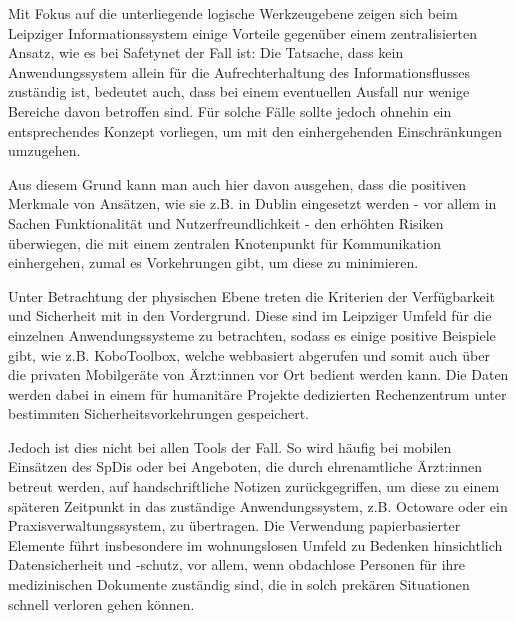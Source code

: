 Mit Fokus auf die unterliegende logische Werkzeugebene zeigen sich beim Leipziger Informationssystem einige Vorteile gegenüber einem zentralisierten Ansatz, wie es bei Safetynet der Fall ist: Die Tatsache, dass kein Anwendungssystem allein für die Aufrechterhaltung des Informationsflusses zuständig ist, bedeutet auch, dass bei einem eventuellen Ausfall nur wenige Bereiche davon betroffen sind. Für solche Fälle sollte jedoch ohnehin ein entsprechendes Konzept vorliegen, um mit den einhergehenden Einschränkungen umzugehen.

Aus diesem Grund kann man auch hier davon ausgehen, dass die positiven Merkmale von Ansätzen, wie sie z.B. in Dublin eingesetzt werden - vor allem in Sachen Funktionalität und Nutzerfreundlichkeit - den erhöhten Risiken überwiegen, die mit einem zentralen Knotenpunkt für Kommunikation einhergehen, zumal es Vorkehrungen gibt, um diese zu minimieren.

Unter Betrachtung der physischen Ebene treten die Kriterien der Verfügbarkeit und Sicherheit mit in den Vordergrund. Diese sind im Leipziger Umfeld für die einzelnen Anwendungssysteme zu betrachten, sodass es einige positive Beispiele gibt, wie z.B. KoboToolbox, welche webbasiert abgerufen und somit auch über die privaten Mobilgeräte von Ärzt:innen vor Ort bedient werden kann. Die Daten werden dabei in einem für humanitäre Projekte dedizierten Rechenzentrum unter bestimmten Sicherheitsvorkehrungen gespeichert.

Jedoch ist dies nicht bei allen Tools der Fall. So wird häufig bei mobilen Einsätzen des \acp{SpDi} oder bei Angeboten, die durch ehrenamtliche Ärzt:innen betreut werden, auf handschriftliche Notizen zurückgegriffen, um diese zu einem späteren Zeitpunkt in das zuständige Anwendungssystem, z.B. Octoware oder ein Praxisverwaltungssystem, zu übertragen. Die Verwendung papierbasierter Elemente führt insbesondere im wohnungslosen Umfeld zu Bedenken hinsichtlich Datensicherheit und -schutz, vor allem, wenn obdachlose Personen für ihre medizinischen Dokumente zuständig sind, die in solch prekären Situationen schnell verloren gehen können.